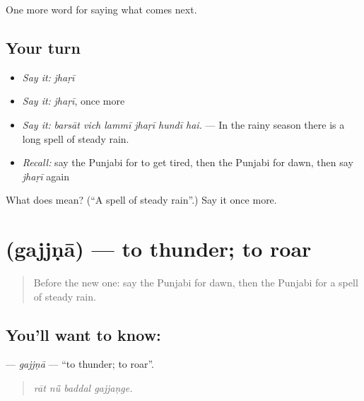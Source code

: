 \begin{grammarlens}[title={What you've built}]
One more word for saying what comes next.
\end{grammarlens}

\subsection*{Your turn}
\begin{itemize}
\raggedright
  \item \emph{Say it:} \emph{jhaṛī}
  \item \emph{Say it:} \emph{jhaṛī}, once more
  \item \emph{Say it:} \emph{barsāt vich lammī jhaṛī hundī hai.} — In the rainy season there is a long spell of steady rain.
  \item \emph{Recall:} say the Punjabi for to get tired, then the Punjabi for dawn, then say \emph{jhaṛī} again
\end{itemize}

\begin{tcolorbox}[breakable,colback=teal!4,colframe=teal!35!black,title={Before you move on}]
What does  mean? (\textquotedblleft{}A spell of steady rain\textquotedblright{}.) Say it once more.
\end{tcolorbox}
\section[\texorpdfstring{\pa{ਗੱਜਣਾ} (gajjṇā)}{ਗੱਜਣਾ (gajjṇā)}]{ (gajjṇā) — to thunder; to roar}

\label{lesson:PA-C286-gajjna}



\begin{quote}
Before the new one: say the Punjabi for dawn, then the Punjabi for a spell of steady rain.
\end{quote}

\subsection*{You'll want to know: }
\textbf{} — \emph{gajjṇā} — \textquotedblleft{}to thunder; to roar\textquotedblright{}.

\begin{quote}
   
\end{quote}

\begin{quote}
\emph{rāt nū̃ baddal gajjaṇge.}
\end{quote}

